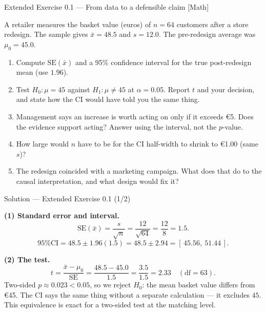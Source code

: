 \documentclass[aspectratio=169,11pt]{beamer}
\begin{document}
\begin{frame}{Extended Exercise 0.1 --- From data to a defensible claim [Math]}
  \begin{longexercise}
    A retailer measures the basket value (euros) of $n = 64$ customers after
    a store redesign. The sample gives $\bar x = 48.5$ and $s = 12.0$. The
    pre-redesign average was $\mu_0 = 45.0$.
    \begin{enumerate}
      \item Compute $\mathrm{SE}(\bar x)$ and a 95\% confidence interval for
            the true post-redesign mean (use $1.96$).
      \item Test $H_0: \mu = 45$ against $H_1: \mu \ne 45$ at $\alpha = 0.05$.
            Report $t$ and your decision, and state how the CI would have
            told you the same thing.
      \item Management says an increase is worth acting on only if it exceeds
            \euro 5. Does the evidence support acting? Answer using the
            interval, not the $p$-value.
      \item How large would $n$ have to be for the CI half-width to shrink to
            \euro 1.00 (same $s$)?
      \item The redesign coincided with a marketing campaign. What does that
            do to the causal interpretation, and what design would fix it?
    \end{enumerate}
  \end{longexercise}
\end{frame}

\begin{frame}{Solution --- Extended Exercise 0.1 (1/2)}
  \begin{solutionbox}
    \textbf{(1) Standard error and interval.}
    \[
      \mathrm{SE}(\bar x) = \frac{s}{\sqrt n} = \frac{12}{\sqrt{64}}
      = \frac{12}{8} = 1.5 .
    \]
    \[
      \text{95\% CI} = 48.5 \pm 1.96(1.5) = 48.5 \pm 2.94
      = [\,45.56,\ 51.44\,] .
    \]

    \textbf{(2) The test.}
    \[
      t = \frac{\bar x - \mu_0}{\mathrm{SE}} = \frac{48.5 - 45.0}{1.5}
        = \frac{3.5}{1.5} = 2.33 \quad (\text{df} = 63).
    \]
    Two-sided $p \approx 0.023 < 0.05$, so we reject $H_0$: the mean basket
    value differs from \euro 45. The CI says the same thing without a
    separate calculation --- it excludes $45$. This equivalence is exact for
    a two-sided test at the matching level.
  \end{solutionbox}
\end{frame}
\end{document}

